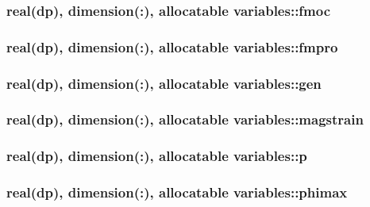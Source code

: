 \hypertarget{classvariables_a62667638543488cf69f047e3906bd3e8}{
\subsubsection[{fmoc}]{\setlength{\rightskip}{0pt plus 5cm}real(dp), dimension(\-:), allocatable variables\-::fmoc}}\label{classvariables_a62667638543488cf69f047e3906bd3e8}
\hypertarget{classvariables_a94a8c673d6ac8598e6c5f57b0bfc9366}{
\subsubsection[{fmpro}]{\setlength{\rightskip}{0pt plus 5cm}real(dp), dimension(\-:), allocatable variables\-::fmpro}}\label{classvariables_a94a8c673d6ac8598e6c5f57b0bfc9366}
\hypertarget{classvariables_a7fba6e5562a27808947cabbcbf416a37}{
\subsubsection[{gen}]{\setlength{\rightskip}{0pt plus 5cm}real(dp), dimension(\-:), allocatable variables\-::gen}}\label{classvariables_a7fba6e5562a27808947cabbcbf416a37}
\hypertarget{classvariables_a3ba4f7a23c9d0f8c379b4004b2926235}{
\subsubsection[{magstrain}]{\setlength{\rightskip}{0pt plus 5cm}real(dp), dimension(\-:), allocatable variables\-::magstrain}}\label{classvariables_a3ba4f7a23c9d0f8c379b4004b2926235}
\hypertarget{classvariables_a8751a3abd1938c8541b57c00a742ec56}{
\subsubsection[{p}]{\setlength{\rightskip}{0pt plus 5cm}real(dp), dimension(\-:), allocatable variables\-::p}}\label{classvariables_a8751a3abd1938c8541b57c00a742ec56}
\hypertarget{classvariables_afe1c9a217b537eb8cef36f9e26e8c789}{
\subsubsection[{phimax}]{\setlength{\rightskip}{0pt plus 5cm}real(dp), dimension(\-:), allocatable variables\-::phimax}}\label{classvariables_afe1c9a217b537eb8cef36f9e26e8c789}
